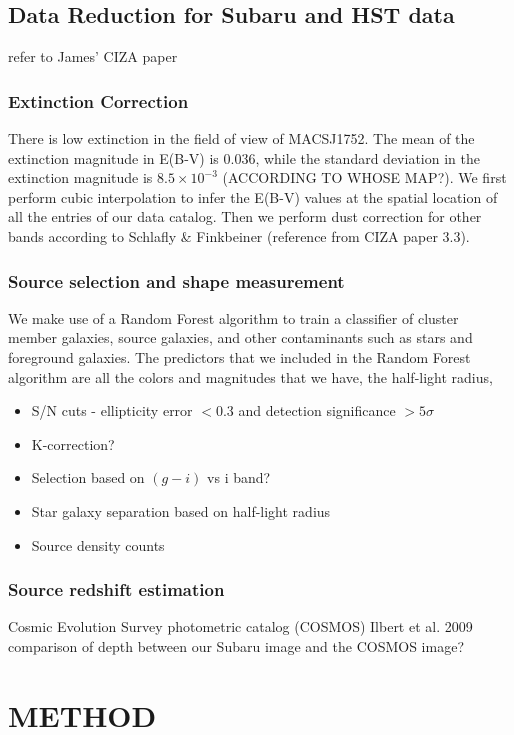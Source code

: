 \documentclass[letterpaper,useAMS,usenatbib]{mn2e}
\begin{document}
\subsection{Data Reduction for Subaru and HST data}
refer to James' CIZA paper

\subsubsection{Extinction Correction}
There is low extinction in the field of view of MACSJ1752. The mean of the extinction
magnitude in E(B-V) is 0.036, while the standard deviation in the extinction
magnitude is $8.5 \times 10^{-3}$ (ACCORDING TO WHOSE MAP?).
We first perform cubic interpolation to infer the E(B-V) values at the spatial
location of all the entries of our data catalog. Then we perform dust
correction for other bands according to Schlafly \& Finkbeiner (reference from CIZA paper 3.3).

\subsubsection{Source selection and shape measurement}
We make use of a Random Forest algorithm to train a classifier of cluster
member galaxies, source galaxies, and other contaminants such as stars
and foreground galaxies.
The predictors that we included in the Random Forest algorithm are all the
colors and magnitudes that we have, the half-light radius,  

\begin{itemize}
	\item S/N cuts - ellipticity error $< 0.3$ and detection significance $> 5\sigma$
	\item K-correction?
	\item Selection based on $(g-i)$ vs i band? 
	\item Star galaxy separation based on half-light radius 
	\item Source density counts   
\end{itemize}

\subsubsection{Source redshift estimation}
Cosmic Evolution Survey photometric catalog (COSMOS) 
Ilbert et al. 2009
comparison of depth between our Subaru image and the COSMOS image?

\section{METHOD}
\end{document}
